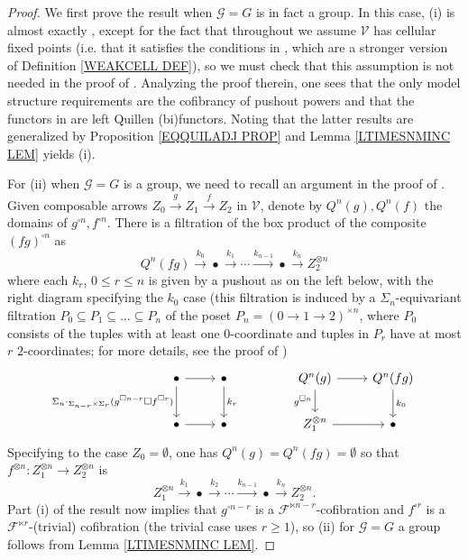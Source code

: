 \documentclass[a4paper,10pt
]{article}%
\numberwithin{equation}{section}
\numberwithin{figure}{section}
\theoremstyle{definition} %
\newcommand{\F}{\ensuremath{\mathcal F}}
\newcommand{\V}{\ensuremath{\mathcal V}}
\newcommand{\G}{\ensuremath{\mathcal G}}
\newcommand{\1}{\ensuremath{\mathbbm 1}}%
\begin{document}
\begin{proof}
	We first prove the result when $\G = G$ is in fact a group.
	In this case,
	(i) is almost exactly \cite[Prop. 6.25]{BP21}, 
	except for the fact that throughout \cite{BP21}
	we assume $\V$ has cellular fixed points
	(i.e. that it satisfies the conditions in 
	\cite[Prop. 2.6]{Ste16}, which are a stronger version of Definition \ref{WEAKCELL DEF}), 
	so we must check that this assumption is not needed in the proof of 
	\cite[Prop. 6.25]{BP21}.
	Analyzing the proof therein, one sees that the only model structure requirements are the cofibrancy of pushout powers
	and that the functors in 
	\cite[Props 6.5 and 6.23]{BP21}
	are left Quillen (bi)functors.
	Noting that the latter results are generalized by Proposition \ref{EQQUILADJ PROP} and Lemma \ref{LTIMESNMINC LEM} yields (i).
	
	
	
	For (ii) when $\G=G$ is a group, we need to recall an argument 
	in the proof of \cite[Prop. 6.25]{BP21}. 
	Given composable arrows $Z_0 \xrightarrow{g} Z_1 \xrightarrow{f} Z_2$ in $\V$,
	denote by $Q^n(g), Q^n(f)$ the domains of $g^{\square n}, f^{\square n}$.
	There is a filtration of the box product of the composite
	$(fg)^{\square n}$ as
	\[
	Q^n(fg)
	\xrightarrow{k_0}
	\bullet
	\xrightarrow{k_1}
	\cdots
	\xrightarrow{k_{n-1}}
	\bullet
	\xrightarrow{k_{n}}
	Z_2^{\otimes n}
	\] 
	where each $k_r$, $0\leq r \leq n$ is given by a pushout as on the left below, with the right diagram specifying the $k_0$ case
	(this filtration is induced by a $\Sigma_n$-equivariant filtration 
	$P_0 \subseteq P_1 \subseteq \dots \subseteq P_n$ of the poset $P_n = (0 \to 1 \to 2)^{\times n}$,
	where $P_0$ consists of the tuples with at least one $0$-coordinate 
	and tuples in $P_r$ have at most $r$ $2$-coordinates;
	for more details, see the proof of \cite[Lemma 4.8]{Pe16})
	\begin{equation}\label{HGBOX_EQ}
	\begin{tikzcd}
	\bullet 
	\arrow[d, "\Sigma_n \cdot_{\Sigma_{n-r} \times \Sigma_r} (g^{\square n-r} \square f^{\square r})"'] \arrow[r]
	&
	\bullet \arrow[d, "k_r"]
	& &%
	Q^n(g) \arrow[r] \arrow[d, "g^{\square n}"']
	&
	Q^n(fg) \arrow[d, "k_0"]
	\\
	\bullet \arrow[r]
	&
	\bullet
	& &%
	Z_1^{\otimes n} \arrow[r]
	&
	\bullet
	\end{tikzcd}
	\end{equation}
	Specifying to the case $Z_0 = \emptyset$, one has
	$Q^n(g)= Q^n(fg) = \emptyset$
	so that $f^{\otimes n} \colon Z_1^{\otimes n} \to Z_2^{\otimes n}$
	is
	\[
	Z_1^{\otimes n}
	\xrightarrow{k_1}
	\bullet
	\xrightarrow{k_2}
	\cdots
	\xrightarrow{k_{n-1}}
	\bullet
	\xrightarrow{k_{n}}
	Z_2^{\otimes n}.
	\] 
	Part (i) of the result now implies that 
	$g^{\square n-r}$
	is a $\F^{\ltimes n-r}$-cofibration
	and
	$f^{\square r}$
	is a $\F^{\ltimes r}$-(trivial) cofibration
	(the trivial case uses $r\geq 1$),
	so (ii) for $\G=G$ a group follows from 
	Lemma \ref{LTIMESNMINC LEM}.
	

\end{proof}
\end{document}
